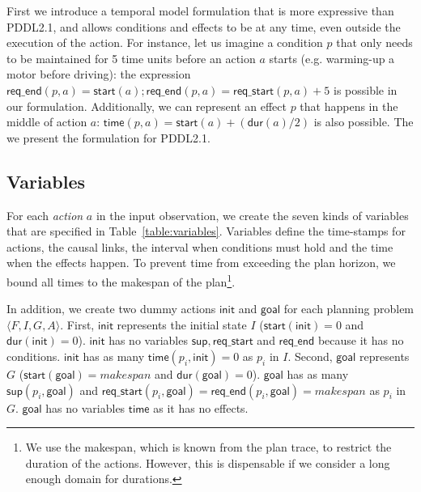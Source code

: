 \documentclass[runningheads]{llncs}
\newcommand{\tup}[1]{{\langle #1 \rangle}}
\newcommand{\dur}{\mathsf{dur}}    %
\newcommand{\start}{\mathsf{start}}%
\newcommand{\supp}{\mathsf{sup}}   %
\newcommand{\tim}{\mathsf{time}}   %
\newcommand{\reqs}{\mathsf{req\_{start}}} %
\newcommand{\reqe}{\mathsf{req\_{end}}}   %
\newcommand{\ini}{\mathsf{init}}   %
\newcommand{\goal}{\mathsf{goal}}  %
\begin{document}
First we introduce a temporal model formulation that is more expressive than PDDL2.1, and allows conditions and effects to be at any time, even outside the execution of the action. For instance, let us imagine a condition $p$ that only needs to be maintained for 5 time units before an action $a$ starts (e.g. warming-up a motor before driving): the expression $\reqe(p,a)=\start(a); \reqe(p,a) = \reqs(p,a)+5$ is possible in our formulation. Additionally, we can represent an effect $p$ that happens in the middle of action $a$: $\tim(p,a) = \start(a)+ (\dur(a) / 2)$ is also possible. The we present the formulation for PDDL2.1.

\subsection{Variables}
For each {\em action} $a$ in the input observation, we create the seven kinds of variables that are specified in Table~\ref{table:variables}. Variables define the time-stamps for actions, the causal links, the interval when conditions must hold and the time when the effects happen. To prevent time from exceeding the plan horizon, we bound all times to the makespan of the plan\footnote{We use the makespan, which is known from the plan trace, to restrict the duration of the actions. However, this is dispensable if we consider a long enough domain for durations.}.

In addition, we create two dummy actions $\ini$ and $\goal$ for each planning problem $\tup{F,I,G,A}$. First, $\ini$ represents the initial state $I$ ($\start(\ini)=0$ and $\dur(\ini)=0$). $\ini$ has no variables $\supp, \reqs$ and $\reqe$ because it has no conditions. $\ini$ has as many $\tim(p_i,\ini)=0$ as $p_i$ in $I$. Second, $\goal$ represents $G$ ($\start(\goal)=makespan$ and $\dur(\goal)=0$). $\goal$ has as many $\supp(p_i,\goal)$ and $\reqs(p_i,\goal)=\reqe(p_i,\goal)=makespan$ as $p_i$ in $G$. $\goal$ has no variables $\tim$ as it has no effects.
\end{document}
